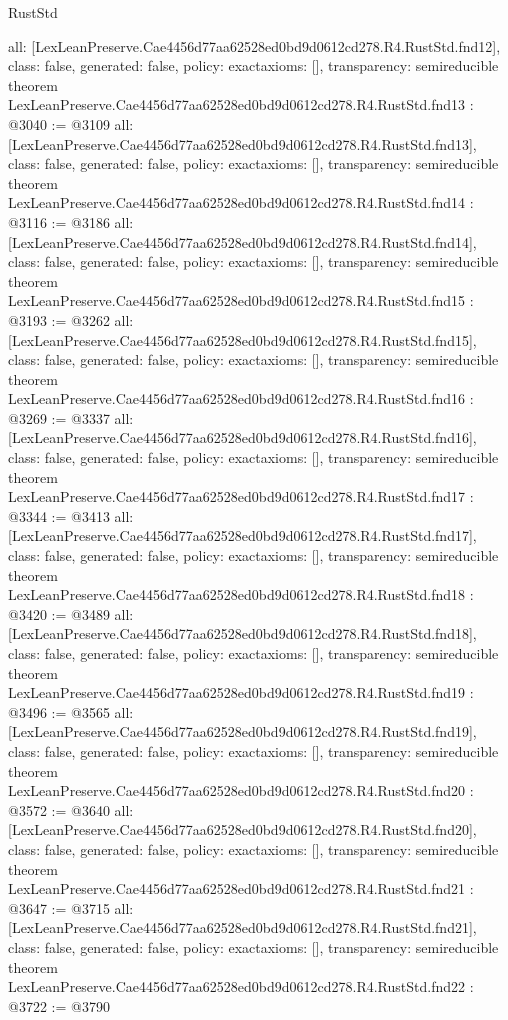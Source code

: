 \begin{lexlean}{RustStd}
\begin{coremodule}
{  all: [LexLeanPreserve.Cae4456d77aa62528ed0bd9d0612cd278.R4.RustStd.fnd12],
  class: false,
  generated: false,
  policy: exact{axioms: []},
  transparency: semireducible
}
theorem LexLeanPreserve.Cae4456d77aa62528ed0bd9d0612cd278.R4.RustStd.fnd13 : @3040 := @3109 {
  all: [LexLeanPreserve.Cae4456d77aa62528ed0bd9d0612cd278.R4.RustStd.fnd13],
  class: false,
  generated: false,
  policy: exact{axioms: []},
  transparency: semireducible
}
theorem LexLeanPreserve.Cae4456d77aa62528ed0bd9d0612cd278.R4.RustStd.fnd14 : @3116 := @3186 {
  all: [LexLeanPreserve.Cae4456d77aa62528ed0bd9d0612cd278.R4.RustStd.fnd14],
  class: false,
  generated: false,
  policy: exact{axioms: []},
  transparency: semireducible
}
theorem LexLeanPreserve.Cae4456d77aa62528ed0bd9d0612cd278.R4.RustStd.fnd15 : @3193 := @3262 {
  all: [LexLeanPreserve.Cae4456d77aa62528ed0bd9d0612cd278.R4.RustStd.fnd15],
  class: false,
  generated: false,
  policy: exact{axioms: []},
  transparency: semireducible
}
theorem LexLeanPreserve.Cae4456d77aa62528ed0bd9d0612cd278.R4.RustStd.fnd16 : @3269 := @3337 {
  all: [LexLeanPreserve.Cae4456d77aa62528ed0bd9d0612cd278.R4.RustStd.fnd16],
  class: false,
  generated: false,
  policy: exact{axioms: []},
  transparency: semireducible
}
theorem LexLeanPreserve.Cae4456d77aa62528ed0bd9d0612cd278.R4.RustStd.fnd17 : @3344 := @3413 {
  all: [LexLeanPreserve.Cae4456d77aa62528ed0bd9d0612cd278.R4.RustStd.fnd17],
  class: false,
  generated: false,
  policy: exact{axioms: []},
  transparency: semireducible
}
theorem LexLeanPreserve.Cae4456d77aa62528ed0bd9d0612cd278.R4.RustStd.fnd18 : @3420 := @3489 {
  all: [LexLeanPreserve.Cae4456d77aa62528ed0bd9d0612cd278.R4.RustStd.fnd18],
  class: false,
  generated: false,
  policy: exact{axioms: []},
  transparency: semireducible
}
theorem LexLeanPreserve.Cae4456d77aa62528ed0bd9d0612cd278.R4.RustStd.fnd19 : @3496 := @3565 {
  all: [LexLeanPreserve.Cae4456d77aa62528ed0bd9d0612cd278.R4.RustStd.fnd19],
  class: false,
  generated: false,
  policy: exact{axioms: []},
  transparency: semireducible
}
theorem LexLeanPreserve.Cae4456d77aa62528ed0bd9d0612cd278.R4.RustStd.fnd20 : @3572 := @3640 {
  all: [LexLeanPreserve.Cae4456d77aa62528ed0bd9d0612cd278.R4.RustStd.fnd20],
  class: false,
  generated: false,
  policy: exact{axioms: []},
  transparency: semireducible
}
theorem LexLeanPreserve.Cae4456d77aa62528ed0bd9d0612cd278.R4.RustStd.fnd21 : @3647 := @3715 {
  all: [LexLeanPreserve.Cae4456d77aa62528ed0bd9d0612cd278.R4.RustStd.fnd21],
  class: false,
  generated: false,
  policy: exact{axioms: []},
  transparency: semireducible
}
theorem LexLeanPreserve.Cae4456d77aa62528ed0bd9d0612cd278.R4.RustStd.fnd22 : @3722 := @3790 {
}
\end{coremodule}
\end{lexlean}
